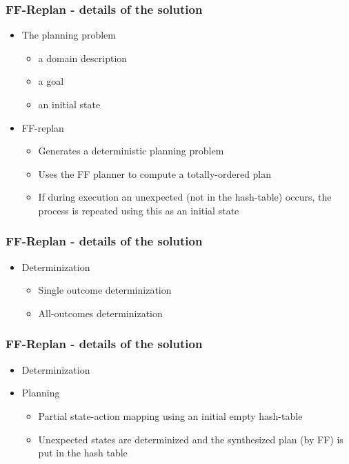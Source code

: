 \documentclass{beamer}
\let\origframetitle=\frametitle
\renewcommand\frametitle[1]{\origframetitle{\textbf{\large{\textrm{#1}}}}}
\begin{document}
\begin{frame}
  \frametitle{FF-Replan - details of the solution}

  \begin{itemize}
    \item The planning problem
      \begin{itemize}
        \item a domain description
        \item a goal
        \item an initial state
      \end{itemize}
    \item FF-replan
      \begin{itemize}
        \item Generates a deterministic planning problem
        \item Uses the FF planner to compute a totally-ordered plan
        \item If during execution an unexpected (not in the hash-table) occurs, the process is repeated using this as an initial state
      \end{itemize}
  \end{itemize}
\end{frame}

\begin{frame}
  \frametitle{FF-Replan - details of the solution}

  \begin{itemize}
    \item Determinization
      \begin{itemize}
        \item Single outcome determinization
        \item All-outcomes determinization
      \end{itemize}
   \end{itemize}
\end{frame}

\begin{frame}
  \frametitle{FF-Replan - details of the solution}

  \begin{itemize}
    \item Determinization
    \item Planning
      \begin{itemize}
        \item Partial state-action mapping using an initial empty hash-table
        \item Unexpected states are determinized and the synthesized plan (by FF) is put in the hash table
      \end{itemize}
   \end{itemize}
\end{frame}
\end{document}
